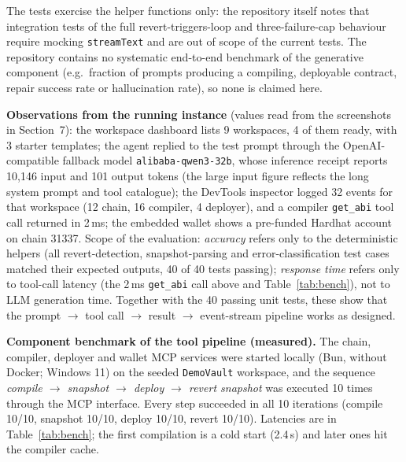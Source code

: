 \documentclass[11pt,letterpaper]{article}
\begin{document}
The tests exercise the helper functions only: the repository itself notes that integration tests of the full revert-triggers-loop and three-failure-cap behaviour require mocking \texttt{streamText} and are out of scope of the current tests. The repository contains no systematic end-to-end benchmark of the generative component (e.g.\ fraction of prompts producing a compiling, deployable contract, repair success rate or hallucination rate), so none is claimed here.

\textbf{Observations from the running instance} (values read from the screenshots in Section~7): the workspace dashboard lists 9 workspaces, 4 of them ready, with 3 starter templates; the agent replied to the test prompt through the OpenAI-compatible fallback model \texttt{alibaba-qwen3-32b}, whose inference receipt reports 10{,}146 input and 101 output tokens (the large input figure reflects the long system prompt and tool catalogue); the DevTools inspector logged 32 events for that workspace (12 chain, 16 compiler, 4 deployer), and a compiler \texttt{get\_abi} tool call returned in 2\,ms; the embedded wallet shows a pre-funded Hardhat account on chain 31337. Scope of the evaluation: \emph{accuracy} refers only to the deterministic helpers (all revert-detection, snapshot-parsing and error-classification test cases matched their expected outputs, 40 of 40 tests passing); \emph{response time} refers only to tool-call latency (the 2\,ms \texttt{get\_abi} call above and Table~\ref{tab:bench}), not to LLM generation time. Together with the 40 passing unit tests, these show that the prompt $\rightarrow$ tool call $\rightarrow$ result $\rightarrow$ event-stream pipeline works as designed.

\textbf{Component benchmark of the tool pipeline (measured).} The chain, compiler, deployer and wallet MCP services were started locally (Bun, without Docker; Windows 11) on the seeded \texttt{DemoVault} workspace, and the sequence \emph{compile $\rightarrow$ snapshot $\rightarrow$ deploy $\rightarrow$ revert snapshot} was executed 10 times through the MCP interface. Every step succeeded in all 10 iterations (compile 10/10, snapshot 10/10, deploy 10/10, revert 10/10). Latencies are in Table~\ref{tab:bench}; the first compilation is a cold start (2.4\,s) and later ones hit the compiler cache.
\end{document}
